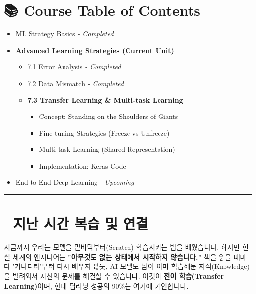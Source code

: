 \documentclass[11pt,a4paper]{book}
\theoremstyle{definition}
\begin{document}
\section*{📚 Course Table of Contents}
\begin{itemize}
    \item[Chapter 1-6.] ML Strategy Basics \textit{- Completed}
    \item[\textbf{Chapter 7.}] \textbf{Advanced Learning Strategies (Current Unit)}
    \begin{itemize}
        \item 7.1 Error Analysis \textit{- Completed}
        \item 7.2 Data Mismatch \textit{- Completed}
        \item \textbf{7.3 Transfer Learning \& Multi-task Learning}
        \begin{itemize}
            \item Concept: Standing on the Shoulders of Giants
            \item Fine-tuning Strategies (Freeze vs Unfreeze)
            \item Multi-task Learning (Shared Representation)
            \item Implementation: Keras Code
        \end{itemize}
    \end{itemize}
    \item[Chapter 8.] End-to-End Deep Learning \textit{- Upcoming}
\end{itemize}

\vspace{0.5cm}
\hrule
\vspace{0.5cm}

\section*{🔗 지난 시간 복습 및 연결}
지금까지 우리는 모델을 밑바닥부터(Scratch) 학습시키는 법을 배웠습니다. 하지만 현실 세계의 엔지니어는 \textbf{"아무것도 없는 상태에서 시작하지 않습니다."}
책을 읽을 때마다 '가나다라'부터 다시 배우지 않듯, AI 모델도 남이 이미 학습해둔 지식(Knowledge)을 빌려와서 자신의 문제를 해결할 수 있습니다. 이것이 \textbf{전이 학습(Transfer Learning)}이며, 현대 딥러닝 성공의 90\%는 여기에 기인합니다.

\end{document}
